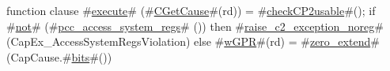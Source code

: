 function clause #\hyperref[zexecute]{execute}# (#\hyperref[zCGetCause]{CGetCause}#(rd)) = 
{
  #\hyperref[zcheckCPtwousable]{checkCP2usable}#();
  if #\hyperref[znot]{not}# (#\hyperref[zpcczyaccesszysystemzyregs]{pcc\_access\_system\_regs}# ()) then
    #\hyperref[zraisezyctwozyexceptionzynoreg]{raise\_c2\_exception\_noreg}#(CapEx_AccessSystemRegsViolation)
  else
    #\hyperref[zwGPR]{wGPR}#(rd) = #\hyperref[zzzerozyextend]{zero\_extend}#(CapCause.#\hyperref[zbits]{bits}#())
}
